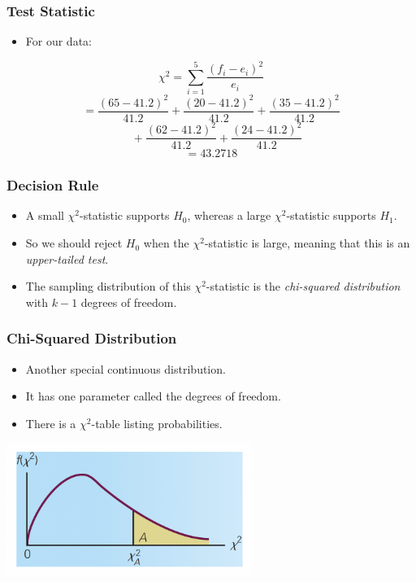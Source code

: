 \documentclass[12pt]{beamer}
\begin{document}
		\begin{frame}
			\frametitle{Test Statistic}
			
			\begin{itemize}[label={\color{blue}$\blacktriangleright$}]
				\item For our data:
			\end{itemize}
			
			\medskip
			
			\[
			\chi^2 = \sum_{i=1}^5 \frac{(f_i - e_i)^2}{e_i}
			\]
			\[
			= \frac{(65 - 41.2)^2}{41.2} + \frac{(20 - 41.2)^2}{41.2} + \frac{(35 - 41.2)^2}{41.2}
			\]
			\[
			\quad + \frac{(62 - 41.2)^2}{41.2} + \frac{(24 - 41.2)^2}{41.2}
			\]
			\[
			= 43.2718
			\]
			
		\end{frame}
		\begin{frame}
			\frametitle{Decision Rule}
			
			\begin{itemize}[label={\color{blue}$\blacktriangleright$}]
				\item A small $\chi^2$-statistic supports $H_0$, whereas a large $\chi^2$-statistic supports $H_1$.
				
				\item So we should reject $H_0$ when the $\chi^2$-statistic is large, meaning that this is an \emph{upper-tailed test}.
				
				\item The sampling distribution of this $\chi^2$-statistic is the \emph{chi-squared distribution} with $k-1$ degrees of freedom.
			\end{itemize}
			
		\end{frame}
		\begin{frame}
			\frametitle{Chi-Squared Distribution}
			
			\begin{itemize}[label={\color{blue}$\blacktriangleright$}]
				\item Another special continuous distribution.
				
				\item It has one parameter called the degrees of freedom.
				
				\item There is a $\chi^2$-table listing probabilities.
			\end{itemize}
			\vspace{0.5cm}
			\centering
			\includegraphics[width=8cm]{chidist.png}
		\end{frame}
\end{document}
